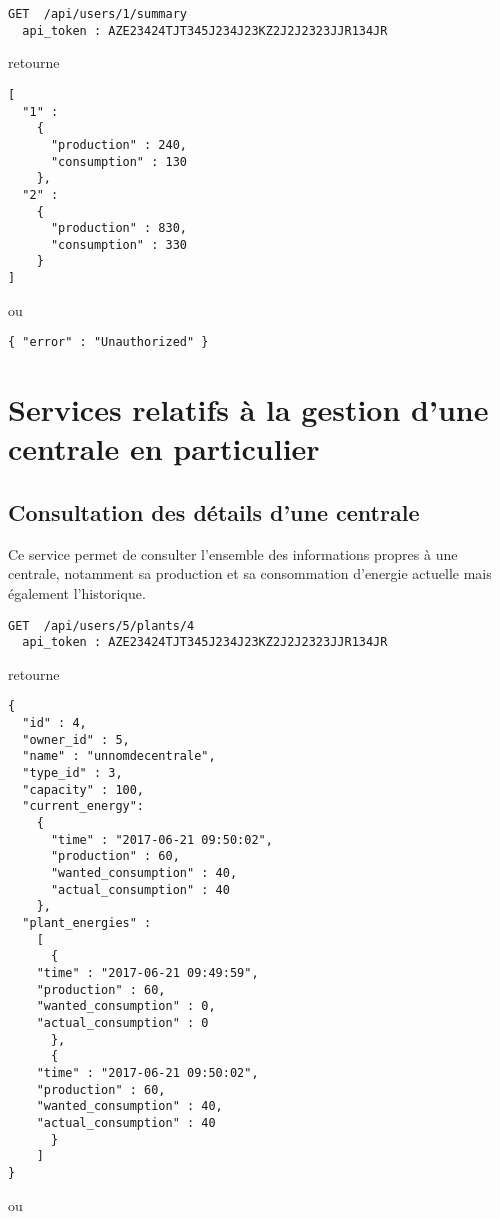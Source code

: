 \begin{lstlisting}
GET  /api/users/1/summary
  api_token : AZE23424TJT345J234J23KZ2J2J2323JJR134JR
\end{lstlisting}

retourne

\begin{lstlisting}
[
  "1" :
    { 
      "production" : 240,
      "consumption" : 130
    },
  "2" :
    { 
      "production" : 830,
      "consumption" : 330
    }
]
\end{lstlisting}

ou 

\begin{lstlisting}
{ "error" : "Unauthorized" }
\end{lstlisting}


\section{Services relatifs à la gestion d'une centrale en particulier}

\subsection{Consultation des détails d'une centrale}

Ce service permet de consulter l'ensemble des informations propres à une centrale,
notamment sa production et sa consommation d'energie actuelle mais également l'historique.

\begin{lstlisting}
GET  /api/users/5/plants/4
  api_token : AZE23424TJT345J234J23KZ2J2J2323JJR134JR
\end{lstlisting}

retourne

\begin{lstlisting}
{
  "id" : 4,
  "owner_id" : 5,
  "name" : "unnomdecentrale",
  "type_id" : 3,
  "capacity" : 100,
  "current_energy":
    {
      "time" : "2017-06-21 09:50:02",
      "production" : 60,
      "wanted_consumption" : 40,
      "actual_consumption" : 40
    },
  "plant_energies" : 
    [
      {
	"time" : "2017-06-21 09:49:59",
	"production" : 60,
	"wanted_consumption" : 0,
	"actual_consumption" : 0
      },
      {
	"time" : "2017-06-21 09:50:02",
	"production" : 60,
	"wanted_consumption" : 40,
	"actual_consumption" : 40
      }
    ]
}
\end{lstlisting}

ou 

